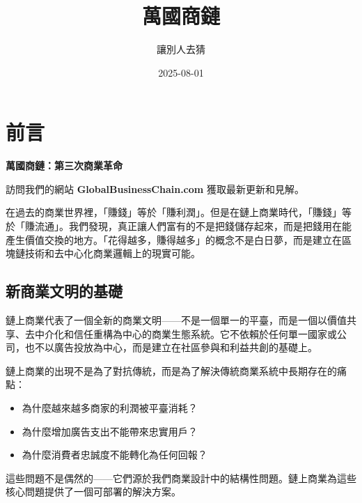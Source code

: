 \documentclass[
  Letterpaper,
]{scrbook}
\title{萬國商鏈}
\author{讓別人去猜}
\date{2025-08-01}
\providecommand{\tightlist}{%
  \setlength{\itemsep}{0pt}\setlength{\parskip}{0pt}}
\renewcommand*\contentsname{Table of contents}
\newcommand\contentsname{Table of contents}
\begin{document}
\frontmatter
\maketitle

\renewcommand*\contentsname{Table of contents}
{
\setcounter{tocdepth}{1}
\tableofcontents
}

\mainmatter
{}

\chapter*{前言}\label{ux524dux8a00}


\textbf{萬國商鏈：第三次商業革命}

訪問我們的網站 \textbf{GlobalBusinessChain.com} 獲取最新更新和見解。

在過去的商業世界裡，「賺錢」等於「賺利潤」。但是在鏈上商業時代，「賺錢」等於「賺流通」。我們發現，真正讓人們富有的不是把錢儲存起來，而是把錢用在能產生價值交換的地方。「花得越多，賺得越多」的概念不是白日夢，而是建立在區塊鏈技術和去中心化商業邏輯上的現實可能。

\section*{新商業文明的基礎}\label{ux65b0ux5546ux696dux6587ux660eux7684ux57faux790e}


鏈上商業代表了一個全新的商業文明------不是一個單一的平臺，而是一個以價值共享、去中介化和信任重構為中心的商業生態系統。它不依賴於任何單一國家或公司，也不以廣告投放為中心，而是建立在社區參與和利益共創的基礎上。

鏈上商業的出現不是為了對抗傳統，而是為了解決傳統商業系統中長期存在的痛點：

\begin{itemize}
\tightlist
\item
  為什麼越來越多商家的利潤被平臺消耗？
\item
  為什麼增加廣告支出不能帶來忠實用戶？
\item
  為什麼消費者忠誠度不能轉化為任何回報？
\end{itemize}

這些問題不是偶然的------它們源於我們商業設計中的結構性問題。鏈上商業為這些核心問題提供了一個可部署的解決方案。
\end{document}
